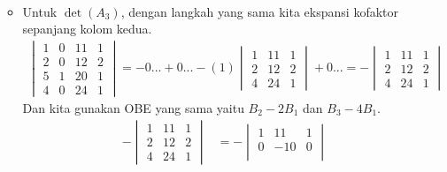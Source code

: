 \documentclass[10pt,openany,a4paper]{article}
\begin{document}
\begin{enumerate}
\begin{itemize}
\begin{align*}
                    \end{align*}
              \item Untuk $\det(A_3)$, dengan langkah yang sama kita ekspansi kofaktor sepanjang kolom kedua.
                    \begin{align*}
                        \begin{vmatrix}
                            1 & 0 & 11 & 1 \\
                            2 & 0 & 12 & 2 \\
                            5 & 1 & 20 & 1 \\
                            4 & 0 & 24 & 1
                        \end{vmatrix}=-0...+0...-(1)\begin{vmatrix}
                                                        1 & 11 & 1 \\
                                                        2 & 12 & 2 \\
                                                        4 & 24 & 1
                                                    \end{vmatrix}+0...=-\begin{vmatrix}
                                                                            1 & 11 & 1 \\
                                                                            2 & 12 & 2 \\
                                                                            4 & 24 & 1
                                                                        \end{vmatrix}
                    \end{align*}
                    Dan kita gunakan OBE yang sama yaitu $B_2-2B_1$ dan $B_3-4B_1$.
                    \begin{align*}
                        -\begin{vmatrix}
                             1 & 11 & 1 \\
                             2 & 12 & 2 \\
                             4 & 24 & 1
                         \end{vmatrix} & =-\begin{vmatrix}
                                               1 & 11  & 1  \\
                                               0 & -10 & 0  \\

\end{vmatrix}
\end{align*}
\end{itemize}
\end{enumerate}
\end{document}

